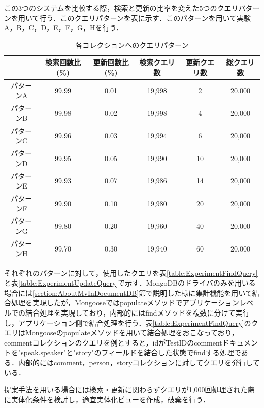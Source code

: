 \documentclass[a4paper,11pt]{ujreport}
\begin{document}
この3つのシステムを比較する際，検索と更新の比率を変えた5つのクエリパターンを用いて行う．このクエリパターンを表に示す．このパターンを用いて実験A，B，C，D，E，F，G，Hを行う．
\begin{table}[htb]
  \begin{center}
    \caption{各コレクションへのクエリパターン}
		\label{table:experiment_query_pattern}
    \begin{tabular}{|c|c|c|c|c|c|} \hline
        & 検索回数比(\%) & 更新回数比(\%) & 検索クエリ数 & 更新クエリ数 & 総クエリ数\\ \hline
      パターンA & 99.99 & 0.01 & 19,998 & 2 & 20,000 \\ \hline
      パターンB & 99.98 & 0.02 & 19,998 & 4 & 20,000 \\ \hline
      パターンC & 99.96 & 0.03 & 19,994 & 6 & 20,000 \\ \hline
			パターンD & 99.95 & 0.05 & 19,990 & 10 & 20,000 \\ \hline
      パターンE & 99.93 & 0.07 & 19,986 & 14 & 20,000 \\ \hline
      パターンF & 99.90 & 0.10 & 19,980 & 20 & 20,000 \\ \hline
      パターンG & 99.80 & 0.20 & 19,960 & 40 & 20,000 \\ \hline
      パターンH & 99.70 & 0.30 & 19,940 & 60 & 20,000 \\ \hline
    \end{tabular}
  \end{center}
\end{table}
それぞれのパターンに対して，使用したクエリを表\ref{table:ExperimentFindQuery}と表\ref{table:ExperimentUpdateQuery}で示す．MongoDBのドライバのみを用いる場合には\ref{section:AboutMvInDocumentDB}節で説明した様に集計機能を用いて結合処理を実現したが，Mongooseではpopulateメソッドでアプリケーションレベルでの結合処理を実現しており，内部的にはfindメソッドを複数に分けて実行し，アプリケーション側で結合処理を行う．表\ref{table:ExperimentFindQuery}のクエリはMongooseのpopulateメソッドを用いて結合処理をおこなっており，commentコレクションのクエリを例とすると，idがTestIDのcommentドキュメントを"speak.speaker"と"story"のフィールドを結合した状態でfindする処理である．内部的にはcomment，person，storyコレクションに対してクエリを発行している．

提案手法を用いる場合には検索・更新に関わらずクエリが1,000回処理された際に実体化条件を検討し，適宜実体化ビューを作成，破棄を行う．
\end{document}
